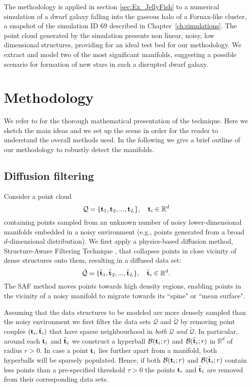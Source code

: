 The methodology is applied in section \ref{sec:Ex_JellyFish} to a numerical simulation of a dwarf galaxy falling into the gaseous halo of a Fornax-like cluster, a snapshot of the simulation ID 69 described in Chapter~\ref{ch:simulations}.
{The point cloud generated by the simulation presents non linear, noisy, low dimensional structures,
providing for an ideal test bed for our methodology.}
We extract and model two of the most significant manifolds, suggesting a possible scenario for formation of new stars in such a disrupted dwarf galaxy.

\section{Methodology} \label{sec:Methodology}
We refer to \citet{Canducci2021} for the thorough mathematical presentation of the technique.
Here we sketch the main ideas and we set up the scene in order for the reader to understand the overall methods used.
In the following we give a brief outline of our methodology to robustly detect the manifolds.

\subsection{Diffusion filtering} \label{sec:SAF}
Consider a point cloud
\[\mathcal{Q} =\{\boldsymbol{\mathbf{t}}_1, \boldsymbol{\mathbf{t}}_2,...,\boldsymbol{\mathbf{t}}_L\},\quad \boldsymbol{\mathbf{t}}_i \in \mathbb{R}^d\]
containing points sampled from an unknown number of noisy lower-dimensional manifolds embedded in a noisy environment (e.g., points generated from a broad $d$-dimensional distribution).
We first apply a physics-based diffusion method, Structure-Aware Filtering Technique \citep[SAF,][]{Wu2018}, that collapses points in close vicinity of dense structures onto them, resulting in a diffused data set:
\[\tilde{\mathcal{Q}} =\{\tilde{\boldsymbol{\mathbf{t}}}_1, \tilde{\boldsymbol{\mathbf{t}}}_2,...,\tilde{\boldsymbol{\mathbf{t}}}_L\},\quad \tilde{\boldsymbol{\mathbf{t}}}_i \in \mathbb{R}^d.\]
The SAF method moves points towards high density regions, enabling points in the vicinity of a noisy manifold to migrate towards its ``spine" or ``mean surface".

Assuming that the data structures to be modeled are more densely sampled than the noisy environment
we first filter the data sets $\mathcal{Q}$ and $\tilde{\mathcal{Q}}$ by removing point couples $(\boldsymbol{\mathbf{t}}_i,\tilde{\boldsymbol{\mathbf{t}}}_i)$ that have sparse neighbourhood in \emph{both} $\mathcal{Q}$ \emph{and} $\tilde{\mathcal{Q}}$.
In particular, around each $\boldsymbol{\mathbf{t}}_i$ and $\tilde{\boldsymbol{\mathbf{t}}}_i$ we construct a hyperball $\mathcal{B}(\boldsymbol{\mathbf{t}}_i;r)$ and $\mathcal{B}(\tilde{\boldsymbol{\mathbf{t}}}_i;r)$ in $\mathbb{R}^d$ of radius $r>0$.
In case a point $\boldsymbol{\mathbf{t}}_i$ lies further apart from a manifold, both hyperballs will be sparsely populated.
Hence, if both $\mathcal{B}(\boldsymbol{\mathbf{t}}_i;r)$ and $\mathcal{B}(\tilde{\boldsymbol{\mathbf{t}}}_i;r)$ contain less points than a pre-specified threshold $\tau>0$ the points $\boldsymbol{\mathbf{t}}_i$ and $\tilde{\boldsymbol{\mathbf{t}}}_i$ are removed from their corresponding data sets.

